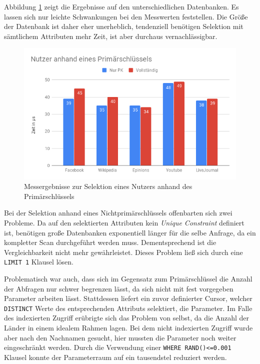 Abbildung \ref{fig:NutzerPk} zeigt die Ergebnisse auf den unterschiedlichen Datenbanken. Es lassen sich nur leichte Schwankungen bei den Messwerten feststellen. Die Größe der Datenbank ist daher eher unerheblich, tendenziell benötigen Selektion mit sämtlichem Attributen mehr Zeit, ist aber durchaus vernachlässigbar.
\begin{figure}
	\centering
	\includegraphics[width=\textwidth]{images/NutzerPk.png}
	\caption{Messergebnisse zur Selektion eines Nutzers anhand des Primärschlüssels}
	\label{fig:NutzerPk}
\end{figure}

Bei der Selektion anhand eines Nichtprimärschlüssels offenbarten sich zwei Probleme. Da auf den selektierten Attributen kein \emph{Unique Constraint} definiert ist, benötigen große Datenbanken exponentiell länger für die selbe Anfrage, da ein kompletter Scan durchgeführt werden muss. Dementsprechend ist die Vergleichbarkeit nicht mehr gewährleistet. Dieses Problem ließ sich durch eine \lstinline{LIMIT 1} Klausel lösen.

Problematisch war auch, dass sich im Gegensatz zum Primärschlüssel die Anzahl der Abfragen nur schwer begrenzen lässt, da sich nicht mit fest vorgegeben Parameter arbeiten lässt. Stattdessen liefert ein zuvor definierter Cursor, welcher \lstinline{DISTINCT} Werte des entsprechenden Attributs selektiert, die Parameter. Im Falle des indexierten Zugriff erübrigte sich das Problem von selbst, da die Anzahl der Länder in einem idealem Rahmen lagen. Bei dem nicht indexierten Zugriff wurde aber nach den Nachnamen gesucht, hier mussten die Parameter noch weiter eingeschränkt werden. Durch die Verwendung einer \lstinline{WHERE RAND()<=0.001} Klausel konnte der Parameterraum auf ein tausendstel reduziert werden.

